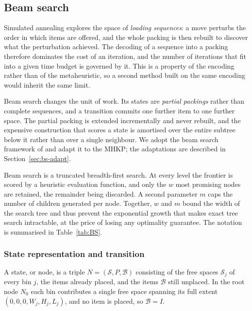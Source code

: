 
\subsection{Beam search}
\label{sec:bs}

Simulated annealing explores the space of \emph{loading sequences}: a move
perturbs the order in which items are offered, and the whole packing is then
rebuilt to discover what the perturbation achieved. The decoding of a sequence
into a packing therefore dominates the cost of an iteration, and the number of
iterations that fit into a given time budget is governed by it. This is a
property of the encoding rather than of the metaheuristic, so a second method
built on the same encoding would inherit the same limit.

Beam search changes the unit of work. Its states are \emph{partial packings}
rather than complete sequences, and a transition commits one further item to
one further space. The partial packing is extended incrementally and never
rebuilt, and the expensive construction that scores a state is amortised over
the entire subtree below it rather than over a single neighbour. We adopt the
beam search framework of \citet{xu2026} and adapt it to the MHKP; the
adaptations are described in Section~\ref{sec:bs-adapt}.

Beam search is a truncated breadth-first search. At every level the frontier is
scored by a heuristic evaluation function, and only the $w$ most promising
nodes are retained, the remainder being discarded. A second parameter $m$ caps
the number of children generated per node. Together, $w$ and $m$ bound the
width of the search tree and thus prevent the exponential growth that makes
exact tree search intractable, at the price of losing any optimality guarantee.
The notation is summarised in Table~\ref{tab:BS}.

\subsubsection{State representation and transition}

A state, or node, is a triple $N = (\mathcal{S}, P, \mathcal{B})$ consisting of
the free spaces $\mathcal{S}_j$ of every bin $j$, the items already placed, and
the items $\mathcal{B}$ still unplaced. In the root node $N_0$ each bin
contributes a single free space spanning its full extent
$(0,0,0,W_j,H_j,L_j)$, and no item is placed, so $\mathcal{B} = I$.

